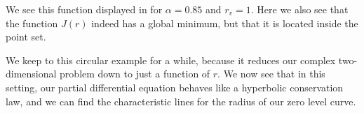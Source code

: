 We see this function displayed in  for $\alpha=0.85$ and $r_v=1$. Here we also see that the function $J(r)$ indeed has a global minimum, but that it is located inside the point set. 

We keep to this circular example for a while, because it reduces our complex two-dimensional problem down to just a function of $r$. We now see that in this setting, our partial differential equation behaves like a hyperbolic conservation law, and we can find the characteristic lines for the radius of our zero level curve.

\begin{comment}
\begin{figure}
    \begin{subfigure}[b]{0.48\linewidth}
    \centering
        \texttt{[image: figures/Model-1/sigma-pos.tex]}
        \caption{Cap} 
        \label{fig:sigma-pos}
    \end{subfigure}
    \begin{subfigure}[b]{0.48\linewidth}
    \centering
        \texttt{[image: figures/Model-1/sigma-neg.tex]}
        \caption{Cap} 
        \label{fig:sigma-neg} 
    \end{subfigure} 
    \caption{Caption}
    \label{fig:sigma-function}
\end{figure}

\end{comment}
